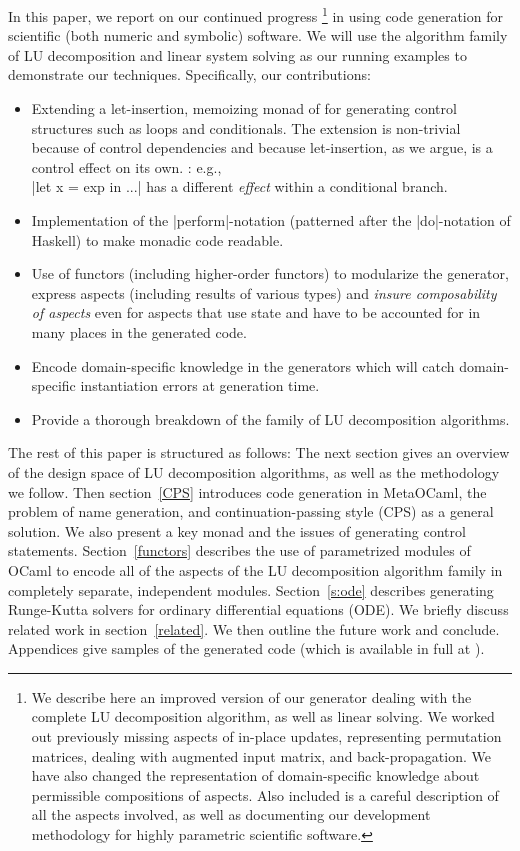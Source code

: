 \documentclass[draft]{elsart}
\begin{document}
In this paper, we report on our continued progress \cite{CaretteKiselyov05}
\footnote{We describe here an improved version of our generator
  dealing with the complete LU decomposition algorithm, as well as
  linear solving. We worked out previously missing aspects of in-place
  updates, representing permutation matrices, dealing with augmented 
  input matrix, and back-propagation. We have also changed the representation
  of domain-specific knowledge about permissible compositions of aspects.
  Also included is a careful description of all the aspects involved, as
  well as documenting our development methodology for highly parametric
  scientific software.}
in using code generation for scientific (both numeric and symbolic)
software.  We will use the algorithm family of LU decomposition 
and linear system solving as our running examples to demonstrate our
techniques.  Specifically, our contributions:
\begin{itemize}
    \item Extending a let-insertion, memoizing monad of
      \cite{MSP:PADL04,KiselyovTaha} for generating control structures
      such as loops and conditionals. The extension is non-trivial
      because of control dependencies and because
      let-insertion, as we argue, is a control effect on its own.
      : e.g.,\\
      |let x = exp in ...| has a different \emph{effect} within a
      conditional branch.
    \item Implementation of the |perform|-notation (patterned after
      the |do|-notation of Haskell) to make monadic code readable.
    \item Use of functors (including higher-order functors) to
      modularize the generator, express aspects (including results of
      various types) and \emph{insure composability of aspects} even
      for aspects that use state and have to be accounted for in many
      places in the generated code.
    \item Encode domain-specific knowledge in the generators which 
      will catch domain-specific instantiation errors at generation
      time.
    \item Provide a thorough breakdown of the family of LU decomposition
      algorithms.
\end{itemize}

The rest of this paper is structured as follows: The next section
gives an overview of the design space of LU decomposition algorithms,
as well as the methodology we follow.  Then section~\ref{CPS}
introduces code generation in MetaOCaml, the problem of name
generation, and continuation-passing style (CPS) as a general
solution.  We also present a key monad and the issues of generating
control statements. Section~\ref{functors} describes the use of
parametrized modules of OCaml to encode all of the aspects of the
LU decomposition algorithm family in completely separate,
independent modules.  Section~\ref{s:ode} describes generating
Runge-Kutta solvers for ordinary differential equations (ODE).
We briefly discuss related work in
section~\ref{related}. We then outline the future work and conclude.
Appendices give samples of the generated code (which is available in
full at \cite{metamonadsURL}).
\end{document}
